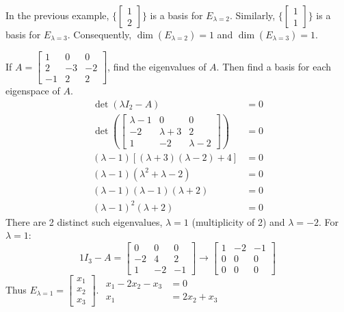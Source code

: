 \documentclass[12pt]{article}
\begin{document}
\begin{example} In the previous example, $\{\begin{bmatrix} 1 \\ 2 \end{bmatrix}\}$ is a basis for $E_{\lambda = 2}$. Similarly, $\{\begin{bmatrix} 1 \\ 1 \end{bmatrix}\}$ is a basis for $E_{\lambda = 3}$. Consequently, $\dim(E_{\lambda = 2}) = 1 $ and $\dim(E_{\lambda = 3}) = 1 $. \end{example} 
\begin{example} If $A = \begin{bmatrix} 1 & 0 & 0 \\ 2 & -3 & -2 \\ -1 & 2 & 2 \end{bmatrix}$, find the eigenvalues of $A$. Then find a basis for each eigenspace of $A$. 
$$\begin{aligned} \det(\lambda I_2 - A) &= 0 \\ \det(\begin{bmatrix} \lambda - 1 & 0 & 0 \\ -2 & \lambda + 3 & 2 \\ 1 & -2 & \lambda - 2 \end{bmatrix}) &= 0 \\ (\lambda - 1)[(\lambda + 3)(\lambda - 2) + 4] &= 0 \\ (\lambda - 1)(\lambda^2 + \lambda - 2) &= 0 \\ (\lambda - 1)(\lambda - 1)(\lambda + 2) &= 0 \\ (\lambda - 1)^2(\lambda + 2) &= 0 \end{aligned} $$ There are 2 distinct such eigenvalues, $\lambda = 1$ (multiplicity of 2) and $\lambda = -2$. \newline
For $\lambda = 1$: $$ 1I_3 - A = \begin{bmatrix} 0 & 0 & 0 \\ -2 & 4 & 2 \\ 1 & -2 & -1 \end{bmatrix} \rightarrow \begin{bmatrix} 1 & -2 & -1 \\ 0 & 0 & 0 \\ 0 & 0 & 0 \end{bmatrix}$$ Thus $E_{\lambda = 1} = \begin{bmatrix} x_1 \\ x_2 \\ x_3 \end{bmatrix}$. $\begin{aligned} x_1 - 2x_2 - x_3 &= 0 \\ x_1 &= 2x_2 + x_3 \end{aligned} $

\end{example}
\end{document}
